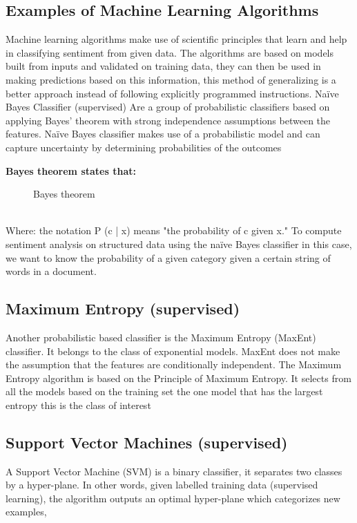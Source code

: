 \subsection{Examples of Machine Learning Algorithms}
Machine learning algorithms make use of scientific principles that learn and help in classifying sentiment from given data. The algorithms are based on models built from inputs and validated on training data, they can then be used in making predictions based on this information, this method of generalizing is a better approach instead of following explicitly programmed instructions. Naïve Bayes Classifier (supervised) Are a group of probabilistic classifiers based on applying Bayes’ theorem with strong independence assumptions between the features. Naïve Bayes classifier makes use of a probabilistic model and can capture uncertainty by determining probabilities of the outcomes \cite{ref29}


\textbf{Bayes theorem states that:}
\begin{figure}[h]
  \centering
  \caption[Bayes theorem]%
  {Bayes theorem}
  \label{fig:ALAP:sm3}
\end{figure}

\leavevmode\\
\noindent 
Where: the notation P (c | x) means "the probability of c given x."
To compute sentiment analysis on structured data using the naïve Bayes classifier in this case, we
want to know the probability of a given category given a certain string of words in a document.

\subsection{Maximum Entropy (supervised)}
Another probabilistic based classifier  is the Maximum Entropy (MaxEnt) classifier. It belongs to the class of
exponential models. MaxEnt does not make the assumption that the features are conditionally independent. 
The Maximum Entropy algorithm is based on the Principle of Maximum Entropy. It selects from all the models based on the training set the one model that has the largest entropy this is the class of interest \cite{ref19}


\subsection{Support Vector Machines (supervised)}
A Support Vector Machine (SVM) is a binary classifier, it separates two classes by a hyper-plane. In other words, given labelled training data (supervised learning), the algorithm
outputs an optimal hyper-plane which categorizes new examples, \cite{ref30}


